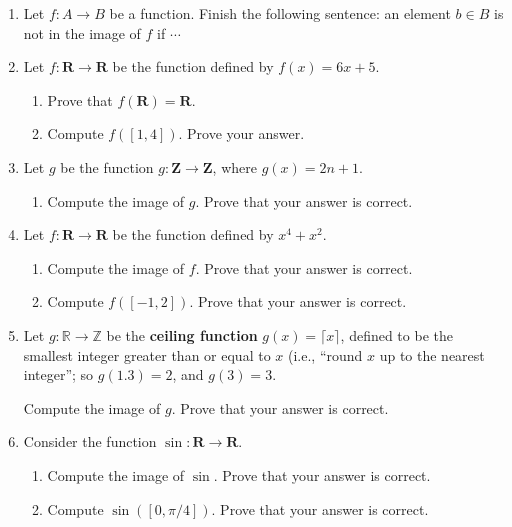 \begin{enumerate}
\item Let $f\colon A \to B$ be a function. Finish the following
  sentence: an element $b \in B$ is not in the image of $f$ if
  $\cdots$
  
\item Let $f \colon \mathbf{R} \to \mathbf{R}$ be the function defined by $f(x) = 6x+5$.
 \begin{enumerate}
 \item Prove that $f(\mathbf{R}) = \mathbf{R}$.
 \item Compute $f([1,4])$. Prove your answer.
 \end{enumerate}

 
\item  Let $g$ be the function $g \colon \mathbf{Z} \to \mathbf{Z}$, where $g(x) = 2n + 1$.
\begin{enumerate}
 \item Compute the image of $g$. Prove that your answer is correct.
\end{enumerate}

  
\item Let $f \colon \mathbf{R} \to \mathbf{R}$ be the function defined by $x^4 + x^2$. 
 \begin{enumerate}
 \item Compute the image of $f$. Prove that your answer is correct.
 \item Compute $f([-1,2])$. Prove that your answer is correct.
\end{enumerate}

\item Let $g \colon \mathbb{R} \to \mathbb{Z}$ be the \textbf{ceiling function} $g(x) = \lceil x \rceil$, defined to be the smallest integer greater than or equal to $x$ (i.e., ``round $x$ up to the nearest integer''; so $g(1.3)  = 2$, and $g(3) = 3$.

  Compute the image of $g$. Prove that your answer is correct.


  
\item Consider the function $\sin \colon \mathbf{R} \to \mathbf{R}$.
  \begin{enumerate}
  \item Compute the image of $\sin$. Prove that your answer is correct.
  \item Compute $\sin([0,\pi/4])$. Prove that your answer is correct.
  \end{enumerate}


\end{enumerate}
